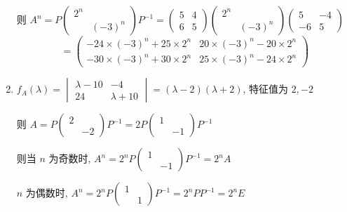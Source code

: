 \begin{enumerate}
			       则 \( A^{n} = P\begin{pmatrix}
				       2^{n} &          \\
				             & (-3)^{n}
			       \end{pmatrix}P^{-1} = \begin{pmatrix}
				       5 & 4 \\
				       6 & 5
			       \end{pmatrix}\begin{pmatrix}
				       2^{n} &          \\
				             & (-3)^{n}
			       \end{pmatrix}\begin{pmatrix}
				       5  & -4 \\
				       -6 & 5
			       \end{pmatrix} \)
			       \[ = \begin{pmatrix}
					       -24\times(-3)^{n} + 25\times2^{n} & 20\times(-3)^{n} - 20\times2^{n} \\
					       -30\times(-3)^{n} + 30\times2^{n} & 25\times(-3)^{n} - 24\times2^{n}
				       \end{pmatrix} \]
			 \item %
			       \( f_{A}(\lambda) = \begin{vmatrix}
				       \lambda - 10 & -4           \\
				       24           & \lambda + 10
			       \end{vmatrix} = (\lambda - 2)(\lambda + 2) \), 特征值为 \( 2, -2 \)

			       则 \( A = P\begin{pmatrix}
				       2 &    \\
				         & -2
			       \end{pmatrix}P^{-1} = 2P\begin{pmatrix}
				       1 &    \\
				         & -1
			       \end{pmatrix}P^{-1} \)

			       则当 \( n \) 为奇数时, \( A^{n} = 2^{n}P\begin{pmatrix}
				       1 &    \\
				         & -1
			       \end{pmatrix}P^{-1} = 2^{n}A \)

			       \( n \) 为偶数时, \( A^{n} = 2^{n}P\begin{pmatrix}
				       1 &   \\
				         & 1
			       \end{pmatrix}P^{-1} = 2^{n}PP^{-1} = 2^{n}E \)
		 \end{enumerate}


